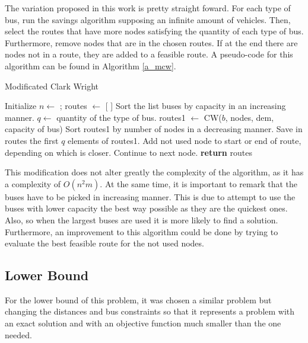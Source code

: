 \documentclass[10pt,twoside]{article}
\begin{document}
The variation proposed in this work is pretty straight foward. For
each type of bus, run the savings algorithm supposing an infinite
amount of vehicles. Then, select the routes that have more nodes
satisfying the quantity of each type of bus. Furthermore, remove nodes
that are in the chosen routes. If at the end there are nodes not in a
route, they are added to a feasible route. A pseudo-code for this
algorithm can be found in Algorithm \ref{a_mcw}.

\begin{algorithm}[H]
\caption{Modificated Clark Wright}\label{a_mcw}
\begin{algorithmic}[1]
  \State Initialize $n \gets $ ; routes $\gets$ [ ] 
  \State Sort the list buses by capacity in an increasing manner.
    \State $q \gets$ quantity of the type of bus.
    \State routes1 $\gets$ CW($b$, nodes, dem, capacity of bus)
    \State Sort routes1 by number of nodes in a decreasing manner.
    \State Save in routes the first $q$ elements of routes1.
  \EndFor
        \State Add not used node to start or end of route, depending on which is closer.
        \State Continue to next node.
      \EndIf
    \EndFor
  \EndFor
   \State \textbf{return} routes
\EndProcedure
\end{algorithmic}
\end{algorithm}

This modification does not alter greatly the complexity of the
algorithm, as it has a complexity of $O(n^2m)$. At the same time, it
is important to remark that the buses have to be picked in increasing
manner. This is due to attempt to use the buses with lower capacity
the best way possible as they are the quickest ones. Also, so when the
largest buses are used it is more likely to find a
solution. Furthermore, an improvement to this algorithm could be done
by trying to evaluate the best feasible route for the not used nodes.

\subsection{Lower Bound}\label{sec_lb}
For the lower bound of this problem, it was chosen a similar problem
but changing the distances and bus constraints so that it represents a
problem with an exact solution and with an objective function much
smaller than the one needed.
\end{document}
